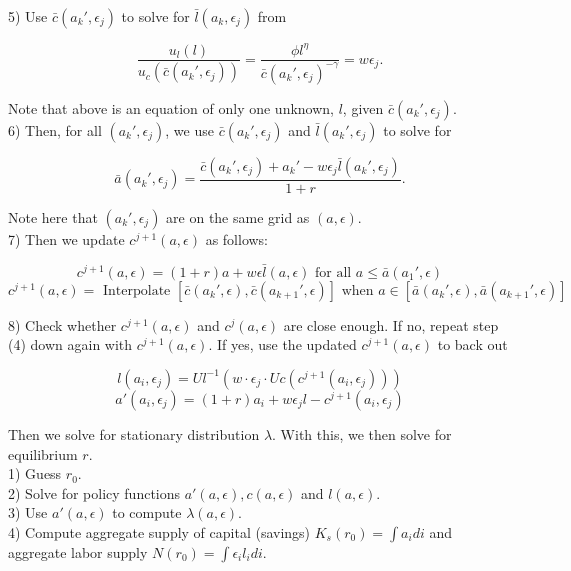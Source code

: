 \documentclass{article}
\begin{document}
		5) Use $\bar{c}(a_{k}', \epsilon_{j})$ to solve for $\bar{l}(a_{k}, \epsilon_{j})$ from
		
		$$\frac{u_{l}(l)}{u_{c}(\bar{c}(a_{k}', \epsilon_{j}))} = \frac{\phi l^{\eta}}{\bar{c}(a_{k}', \epsilon_{j})^{-\gamma}} = w\epsilon_{j}.$$
		
		Note that above is an equation of only one unknown, $l$, given $\bar{c}(a_{k}',\epsilon_{j})$. \\
		
		6) Then, for all $(a_{k}',\epsilon_{j})$, we use $\bar{c}(a_{k}',\epsilon_{j})$ and $\bar{l}(a_{k}',\epsilon_{j})$ to solve for 
		
		$$\bar{a}(a_{k}', \epsilon_{j}) = \frac{\bar{c}(a_{k}', \epsilon_{j}) + a_{k}' - w\epsilon_{j}\bar{l}(a_{k}',\epsilon_{j})}{1+r}.$$
		
		Note here that $(a_{k}', \epsilon_{j})$ are on the same grid as $(a,\epsilon)$. \\
		
		7) Then we update $c^{j+1}(a,\epsilon)$ as follows:
		
		$$c^{j+1}(a,\epsilon) = (1+r)a + w \epsilon\bar{l}(a,\epsilon) \text{ for all } a \leq \bar{a}(a_{1}', \epsilon)$$
		$$c^{j+1}(a,\epsilon) = \text{ Interpolate } [\bar{c}(a_{k}', \epsilon), \bar{c}(a_{k+1}', \epsilon)] \text{ when } a \in [\bar{a}(a_{k}', \epsilon), \bar{a}(a_{k+1}', \epsilon)]$$
		
		8) Check whether $c^{j+1}(a,\epsilon)$ and $c^{j}(a,\epsilon)$ are close enough. If no, repeat step (4) down again with $c^{j+1}(a,\epsilon)$. If yes, use the updated $c^{j+1}(a,\epsilon)$ to back out 
		
		$$l(a_{i},\epsilon_{j}) = Ul^{-1}(w \cdot \epsilon_{j} \cdot Uc(c^{j+1}(a_{i},\epsilon_{j})))$$
		$$a'(a_{i},\epsilon_{j}) = (1+r)a_{i} + w \epsilon_{j} l - c^{j+1}(a_{i},\epsilon_{j})$$
		
		Then we solve for stationary distribution $\lambda$. With this, we then solve for equilibrium $r$. \\
		
		1) Guess $r_{0}$. \\
		
		2) Solve for policy functions $a'(a,\epsilon),c(a,\epsilon)$ and $l(a,\epsilon)$. \\
		
		3) Use $a'(a,\epsilon)$ to compute $\lambda(a,\epsilon)$. \\
		
		4) Compute aggregate supply of capital (savings) $K_{s}(r_{0}) = \int a_{i}di$ and aggregate labor supply $N(r_{0}) = \int \epsilon_{i}l_{i}di$. \\
		
\end{document}
